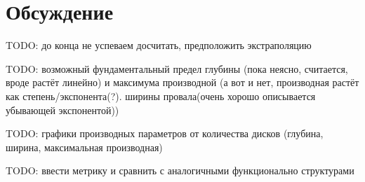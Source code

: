 \section{Обсуждение}

TODO: до конца не успеваем досчитать, предположить экстраполяцию

TODO: возможный фундаментальный предел глубины (пока неясно, считается, вроде растёт линейно) и максимума производной (а вот и нет, производная растёт как степень/экспонента(?). ширины провала(очень хорошо описывается убывающей экспонентой))

TODO: графики производных параметров от количества дисков (глубина, ширина, максимальная производная)

TODO: ввести метрику и сравнить с аналогичными функционально структурами